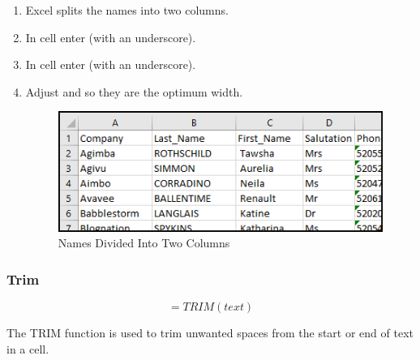 \begin{enumbox}
\begin{enumerate}
		\item Excel splits the names into two columns. 
		\item In cell  enter  (with an underscore).
		\item In cell  enter  (with an underscore).
		\item Adjust  and  so they are the optimum width.
		
		\begin{figure}[H]
			\centering
			\includegraphics[width=\maxwidth{.95\linewidth}]{gfx/ch09_fig33}
			\caption{Names Divided Into Two Columns}
			\label{09:fig33}
		\end{figure}
	\end{enumerate}
\end{enumbox}
	
\subsubsection{Trim}

\[ =TRIM(text) \]

The TRIM function is used to trim unwanted spaces from the start or end of text in a cell.

